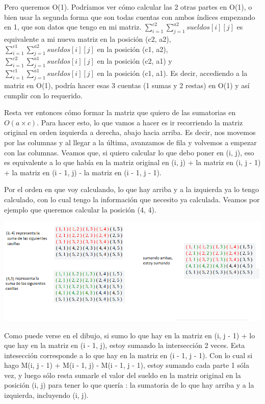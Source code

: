 Pero queremos O(1). Podríamos ver cómo calcular las 2 otras partes en O(1), o bien usar la segunda forma que son todas cuentas con ambos índices empezando en 1, que son datos que tengo en mi matriz. $\sum_{i = 1}^{c2} \sum_{j = 1}^{a2} sueldos[i][j]$ es equivalente a mi nueva matriz en la posición (c2, a2), $\sum_{i = 1}^{c1} \sum_{j = 1}^{a2} sueldos[i][j]$ en la posición (c1, a2), $\sum_{i = 1}^{c2} \sum_{j = 1}^{a1} sueldos[i][j]$ en la posición (c2, a1) y $\sum_{i = 1}^{c1} \sum_{j = 1}^{a1} sueldos[i][j]$ en la posición (c1, a1). Es decir, accediendo a la matriz en O(1), podría hacer esas 3 cuentas (1 sumas y 2 restas) en O(1) y así cumplir con lo requerido.  \newline

Resta ver entonces cómo formar la matriz que quiero de las sumatorias en $O(a \times c)$. Para hacer esto, lo que vamos a hacer es ir recorriendo la matriz original en orden izquierda a derecha, abajo hacia arriba. Es decir, nos movemos por las columnas y al llegar a la última, avanzamos de fila y volvemos a empezar con las columnas. Veamos que, si quiero calcular lo que debo poner en (i, j), eso es equivalente a lo que había en la matriz original en (i, j) + la matriz en (i, j - 1) + la matriz en (i - 1, j) - la matriz en (i - 1, j - 1).  \newline

Por el orden en que voy calculando, lo que hay arriba y a la izquierda ya lo tengo calculado, con lo cual tengo la información que necesito ya calculada. Veamos por ejemplo que queremos calcular la posición (4, 4).

\includegraphics[scale=0.5]{img/tabla.jpg}

Como puede verse en el dibujo, si sumo lo que hay en la matriz en (i, j - 1) + lo que hay en la matriz en (i - 1, j), estoy sumando la intersección 2 veces. Esta intesección corresponde a lo que hay en la matriz en (i - 1, j - 1). Con lo cual si hago M(i, j - 1) + M(i - 1, j) - M(i - 1, j - 1), estoy sumando cada parte 1 sóla vez, y luego sólo resta sumarle el valor del sueldo en la matriz original en la posición (i, j) para tener lo que quería : la sumatoria de lo que hay arriba y a la izquierda, incluyendo (i, j). \newline

